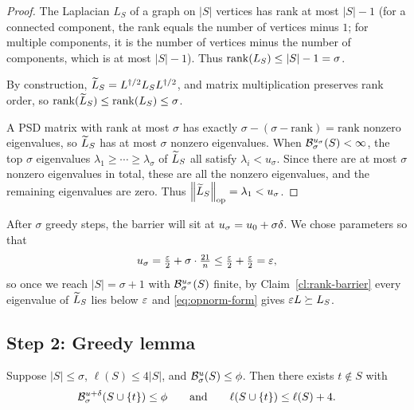 \begin{proof}
The Laplacian $L_S$ of a graph on $|S|$ vertices has rank at most $|S|-1$ (for a
connected component, the rank equals the number of vertices minus $1$; for
multiple components, it is the number of vertices minus the number of components,
which is at most $|S|-1$). Thus $\operatorname{rank}(L_S)\le|S|-1=\sigma$.

By construction, $\widetilde{L}_S=L^{\dagger/2} L_SL^{\dagger/2}$, and matrix multiplication
preserves rank order, so $\operatorname{rank}(\widetilde{L}_S)\le\operatorname{rank}(L_S)\le\sigma$.

A PSD matrix with rank at most $\sigma$ has exactly $\sigma - (\sigma - \text{rank})
= \text{rank}$ nonzero eigenvalues, so $\widetilde{L}_S$ has at most $\sigma$ nonzero
eigenvalues. When $\mathcal{B}^{u_\sigma}_{\sigma}(S)<\infty$, the top $\sigma$
eigenvalues $\lambda_1\ge\cdots\ge\lambda_\sigma$ of $\widetilde{L}_S$ all satisfy
$\lambda_i < u_\sigma$. Since there are at most $\sigma$ nonzero eigenvalues in
total, these are all the nonzero eigenvalues, and the remaining eigenvalues are
zero. Thus $\left\lVert \widetilde{L}_S \right\rVert_{\mathrm{op}} = \lambda_1 < u_\sigma$.
\end{proof}

After $\sigma$ greedy steps, the barrier will sit at $u_\sigma=u_0+\sigma\delta$.
We chose parameters so that
\[
  u_\sigma = \tfrac{\varepsilon}{2} + \sigma\cdot\tfrac{21}{n}
           \le \tfrac{\varepsilon}{2} + \tfrac{\varepsilon}{2} = \varepsilon,
\]
so once we reach $|S|=\sigma+1$ with $\mathcal{B}^{u_\sigma}_{\sigma}(S)$ finite, by
Claim~\ref{cl:rank-barrier} every eigenvalue of $\widetilde{L}_S$ lies below $\varepsilon$ and
\eqref{eq:opnorm-form} gives $\varepsilon L\succeq L_S$.

\subsection*{Step 2: Greedy lemma}

\begin{qsixlemma}\label{lem:greedy}
Suppose $|S|\le\sigma$, $\ell(S)\le 4|S|$, and $\mathcal{B}^{u}_{\sigma}(S)\le\phi$. Then
there exists $t\notin S$ with
\[
  \mathcal{B}^{u+\delta}_{\sigma}(S\cup\{t\})\le\phi
  \qquad\text{and}\qquad
  \ell(S\cup\{t\})\le\ell(S)+4.
\]
\end{qsixlemma}

